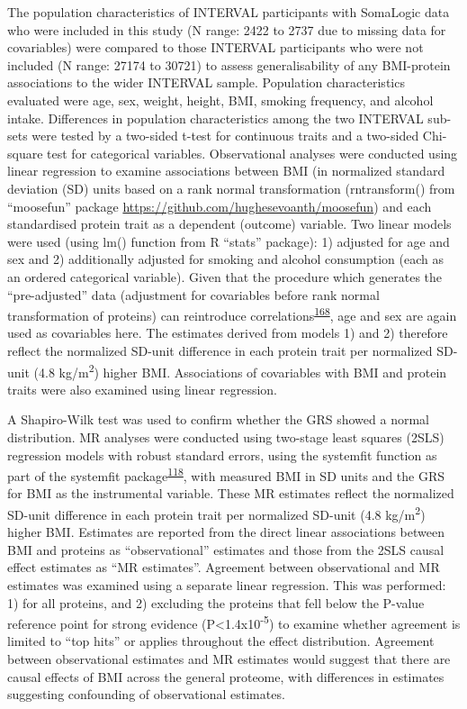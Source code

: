 \documentclass[11pt,twoside]{bristolthesis}
\begin{document}
The population characteristics of INTERVAL participants with SomaLogic data who were included in this study (N range: 2422 to 2737 due to missing data for covariables) were compared to those INTERVAL participants who were not included (N range: 27174 to 30721) to assess generalisability of any BMI-protein associations to the wider INTERVAL sample. Population characteristics evaluated were age, sex, weight, height, BMI, smoking frequency, and alcohol intake. Differences in population characteristics among the two INTERVAL sub-sets were tested by a two-sided t-test for continuous traits and a two-sided Chi-square test for categorical variables. Observational analyses were conducted using linear regression to examine associations between BMI (in normalized standard deviation (SD) units based on a rank normal transformation (rntransform() from ``moosefun'' package \url{https://github.com/hughesevoanth/moosefun}) and each standardised protein trait as a dependent (outcome) variable. Two linear models were used (using lm() function from R ``stats'' package): 1) adjusted for age and sex and 2) additionally adjusted for smoking and alcohol consumption (each as an ordered categorical variable). Given that the procedure which generates the ``pre-adjusted'' data (adjustment for covariables before rank normal transformation of proteins) can reintroduce correlations\textsuperscript{\protect\hyperlink{ref-Pain2018}{168}}, age and sex are again used as covariables here. The estimates derived from models 1) and 2) therefore reflect the normalized SD-unit difference in each protein trait per normalized SD-unit (4.8 kg/m\textsuperscript{2}) higher BMI. Associations of covariables with BMI and protein traits were also examined using linear regression.

A Shapiro-Wilk test was used to confirm whether the GRS showed a normal distribution. MR analyses were conducted using two-stage least squares (2SLS) regression models with robust standard errors, using the systemfit function as part of the systemfit package\textsuperscript{\protect\hyperlink{ref-Henningsen2007}{118}}, with measured BMI in SD units and the GRS for BMI as the instrumental variable. These MR estimates reflect the normalized SD-unit difference in each protein trait per normalized SD-unit (4.8 kg/m\textsuperscript{2}) higher BMI. Estimates are reported from the direct linear associations between BMI and proteins as ``observational'' estimates and those from the 2SLS causal effect estimates as ``MR estimates''. Agreement between observational and MR estimates was examined using a separate linear regression. This was performed: 1) for all proteins, and 2) excluding the proteins that fell below the P-value reference point for strong evidence (P\textless1.4x10\textsuperscript{-5}) to examine whether agreement is limited to ``top hits'' or applies throughout the effect distribution. Agreement between observational estimates and MR estimates would suggest that there are causal effects of BMI across the general proteome, with differences in estimates suggesting confounding of observational estimates.
\end{document}
